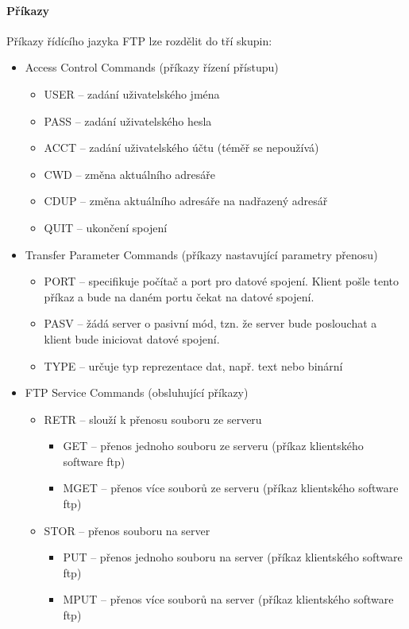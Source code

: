 \documentclass[10pt,a4paper]{article}
\begin{document}
\paragraph{Příkazy}
Příkazy řídícího jazyka FTP lze rozdělit do tří skupin:
\begin{itemize}
	\item Access Control Commands (příkazy řízení přístupu)
	\begin{itemize}
		\item USER – zadání uživatelského jména
		\item PASS – zadání uživatelského hesla
		\item ACCT – zadání uživatelského účtu (téměř se nepoužívá)
		\item CWD – změna aktuálního adresáře
		\item CDUP – změna aktuálního adresáře na nadřazený adresář
		\item QUIT – ukončení spojení
	\end{itemize}
	\item Transfer Parameter Commands (příkazy nastavující parametry přenosu)
	\begin{itemize}
		\item PORT – specifikuje počítač a port pro datové spojení. Klient pošle tento příkaz a bude na daném portu čekat na datové spojení.
		\item PASV – žádá server o pasivní mód, tzn. že server bude poslouchat a klient bude iniciovat datové spojení.
		\item TYPE – určuje typ reprezentace dat, např. text nebo binární
	\end{itemize}
	\item FTP Service Commands (obsluhující příkazy)
	\begin{itemize}
		\item RETR – slouží k přenosu souboru ze serveru
		\begin{itemize}
			\item GET – přenos jednoho souboru ze serveru (příkaz klientského software ftp)
			\item MGET – přenos více souborů ze serveru (příkaz klientského software ftp)
		\end{itemize}
		\item STOR – přenos souboru na server
		\begin{itemize}
			\item PUT – přenos jednoho souboru na server (příkaz klientského software ftp)
			\item MPUT – přenos více souborů na server (příkaz klientského software ftp)

\end{itemize}
\end{itemize}
\end{itemize}
\end{document}
